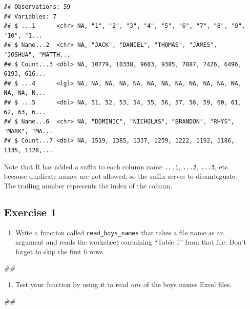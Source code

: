 \documentclass[]{book}
\newenvironment{Shaded}{\begin{snugshade}}{\end{snugshade}}
\newcommand{\CommentTok}[1]{\textcolor[rgb]{0.56,0.35,0.01}{\textit{#1}}}
\providecommand{\tightlist}{%
  \setlength{\itemsep}{0pt}\setlength{\parskip}{0pt}}
\begin{document}
\begin{verbatim}
## Observations: 59
## Variables: 7
## $ ...1      <chr> NA, "1", "2", "3", "4", "5", "6", "7", "8", "9", "10", "1...
## $ Name...2  <chr> NA, "JACK", "DANIEL", "THOMAS", "JAMES", "JOSHUA", "MATTH...
## $ Count...3 <dbl> NA, 10779, 10338, 9603, 9385, 7887, 7426, 6496, 6193, 616...
## $ ...4      <lgl> NA, NA, NA, NA, NA, NA, NA, NA, NA, NA, NA, NA, NA, NA, N...
## $ ...5      <dbl> NA, 51, 52, 53, 54, 55, 56, 57, 58, 59, 60, 61, 62, 63, 6...
## $ Name...6  <chr> NA, "DOMINIC", "NICHOLAS", "BRANDON", "RHYS", "MARK", "MA...
## $ Count...7 <dbl> NA, 1519, 1385, 1337, 1259, 1222, 1192, 1186, 1135, 1128,...
\end{verbatim}

Note that R has added a suffix to each column name \texttt{...1}, \texttt{...2},
\texttt{...3}, etc. because duplicate names are not allowed, so the suffix serves
to disambiguate. The trailing number represents the index of the column.

\hypertarget{exercise-1-3}{%
\subsection{Exercise 1}\label{exercise-1-3}}

\begin{enumerate}
\def\labelenumi{\arabic{enumi}.}
\tightlist
\item
  Write a function called \texttt{read\_boys\_names} that takes a file name as an argument
  and reads the worksheet containing ``Table 1'' from that file. Don't forget
  to skip the first 6 rows.
\end{enumerate}

\begin{Shaded}
\begin{Highlighting}[]
\CommentTok{## }
\end{Highlighting}
\end{Shaded}

\begin{enumerate}
\def\labelenumi{\arabic{enumi}.}
\setcounter{enumi}{1}
\tightlist
\item
  Test your function by using it to read \emph{one} of the boys names
  Excel files.
\end{enumerate}

\begin{Shaded}
\begin{Highlighting}[]
\CommentTok{## }
\end{Highlighting}
\end{Shaded}
\end{document}
